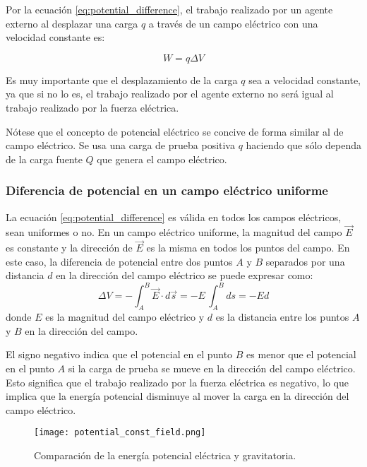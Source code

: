 Por la ecuación \eqref{eq:potential_difference}, el trabajo realizado por un agente externo al desplazar una carga \(q\) a través de un campo eléctrico con una velocidad constante es:

\[
W=q\Delta V
\]

Es muy importante que el desplazamiento de la carga \(q\) sea a velocidad constante, ya que si no lo es, el trabajo realizado por el agente externo no será igual al trabajo realizado por la fuerza eléctrica. 

Nótese que el concepto de potencial eléctrico se concive de forma similar al de campo eléctrico. Se usa una carga de prueba positiva \(q\) haciendo que sólo dependa de la carga fuente \(Q\) que genera el campo eléctrico. 

\subsubsection{Diferencia de potencial en un campo eléctrico uniforme}

La ecuación \eqref{eq:potential_difference} es válida en todos los campos eléctricos, sean uniformes o no. En un campo eléctrico uniforme, la magnitud del campo \(\vec{E}\) es constante y la dirección de \(\vec{E}\) es la misma en todos los puntos del campo. En este caso, la diferencia de potencial entre dos puntos \(A\) y \(B\) separados por una distancia \(d\) en la dirección del campo eléctrico se puede expresar como:
\begin{equation}
    \Delta V = -\int_A^B \vec{E} \cdot d\vec{s} = -E \, \int_A^B ds = \boxed{-Ed}
    \label{eq:potential_uniform}
\end{equation}
donde \(E\) es la magnitud del campo eléctrico y \(d\) es la distancia entre los puntos \(A\) y \(B\) en la dirección del campo.

El signo negativo indica que el potencial en el punto \(B\) es menor que el potencial en el punto \(A\) si la carga de prueba se mueve en la dirección del campo eléctrico. Esto significa que el trabajo realizado por la fuerza eléctrica es negativo, lo que implica que la energía potencial disminuye al mover la carga en la dirección del campo eléctrico.

\begin{figure}[ht]
    \centering
    \texttt{[image: potential\_const\_field.png]}
    \caption{Comparación de la energía potencial eléctrica y gravitatoria.}
    \label{fig:potential_uniform}
\end{figure}

